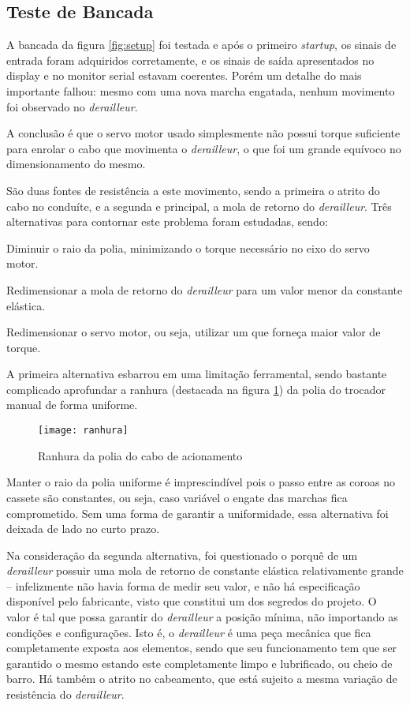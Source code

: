 \documentclass[a4paper,11pt]{article}
\begin{document}
\subsection{Teste de Bancada}

A bancada da figura \ref{fig:setup} foi testada e após o primeiro
\textit{startup}, os sinais de entrada foram adquiridos corretamente, e os
sinais de saída apresentados no display e no monitor serial estavam coerentes.
Porém um detalhe do mais importante falhou: mesmo com uma nova marcha engatada,
nenhum movimento foi observado no \textit{derailleur}.

A conclusão é que o servo motor usado simplesmente não possui torque suficiente
para enrolar o cabo que movimenta o \textit{derailleur}, o que foi um grande
equívoco no dimensionamento do mesmo.

São duas fontes de resistência a este movimento, sendo a primeira o atrito do
cabo no conduíte, e a segunda e principal, a mola de retorno do
\textit{derailleur}. Três alternativas para contornar este problema foram
estudadas, sendo:
\begin{enumerate*}
  \item Diminuir o raio da polia, minimizando o torque necessário no eixo do
servo motor.
  \item Redimensionar a mola de retorno do \textit{derailleur} para um valor
menor da constante elástica.
  \item Redimensionar o servo motor, ou seja, utilizar um que forneça maior
valor de torque.
\end{enumerate*}

A primeira alternativa esbarrou em uma limitação ferramental, sendo bastante
complicado aprofundar a ranhura (destacada na figura \ref{fig:ranhura}) da polia
do trocador manual de forma uniforme.
\begin{figure}[!h]
\begin{center}
  \texttt{[image: ranhura]}
\end{center}
  \caption{Ranhura da polia do cabo de acionamento}
  \label{fig:ranhura}
\end{figure}

Manter o raio da polia uniforme é imprescindível pois o passo entre as coroas
no cassete são constantes, ou seja, caso variável o engate das marchas fica
comprometido. Sem uma forma de garantir a uniformidade, essa alternativa foi
deixada de lado no curto prazo.

Na consideração da segunda alternativa, foi questionado o porquê de um
\textit{derailleur} possuir uma mola de retorno de constante elástica
relativamente grande -- infelizmente não havia forma de medir seu valor, e não
há especificação disponível pelo fabricante, visto que constitui um dos
segredos do projeto. O valor é tal que possa garantir do \textit{derailleur} a
posição mínima, não importando as condições e configurações. Isto é, o
\textit{derailleur} é uma peça mecânica que fica completamente exposta aos
elementos, sendo que seu funcionamento tem que ser garantido o mesmo estando
este completamente limpo e lubrificado, ou cheio de barro. Há também o atrito no
cabeamento, que está sujeito a mesma variação de resistência do
\textit{derailleur}.
\end{document}
